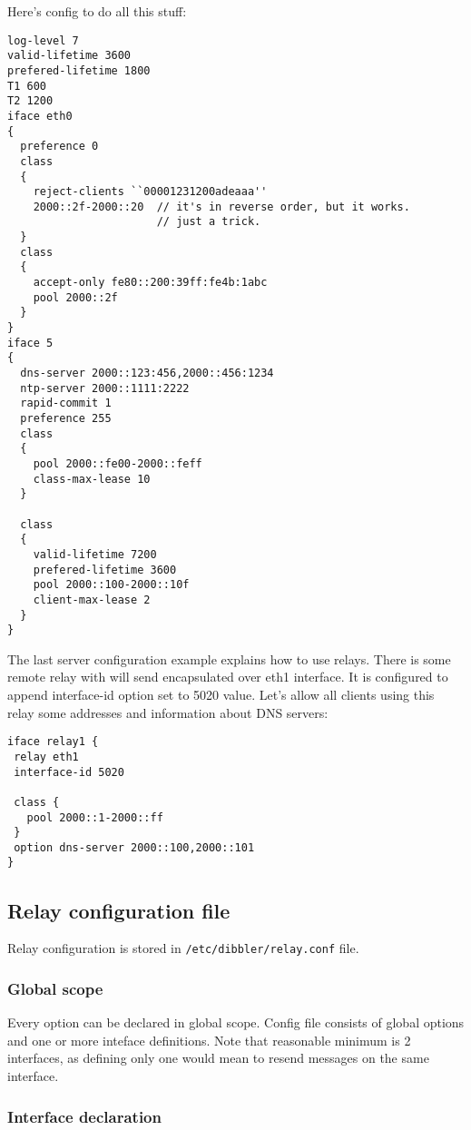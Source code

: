 Here's config to do all this stuff:

\begin{verbatim}
log-level 7
valid-lifetime 3600
prefered-lifetime 1800
T1 600
T2 1200
iface eth0
{
  preference 0
  class
  {
    reject-clients ``00001231200adeaaa''
    2000::2f-2000::20  // it's in reverse order, but it works.
                       // just a trick. 
  }
  class
  {
    accept-only fe80::200:39ff:fe4b:1abc
    pool 2000::2f 
  }
}
iface 5
{
  dns-server 2000::123:456,2000::456:1234
  ntp-server 2000::1111:2222
  rapid-commit 1
  preference 255
  class
  {
    pool 2000::fe00-2000::feff
    class-max-lease 10
  }
  
  class
  {
    valid-lifetime 7200
    prefered-lifetime 3600
    pool 2000::100-2000::10f
    client-max-lease 2
  } 
}
\end{verbatim}

The last server configuration example explains how to use
relays. There is some remote relay with will send encapsulated over
eth1 interface. It is configured to append interface-id option set to
5020 value. Let's allow all clients using this relay some addresses
and information about DNS servers:

\begin{verbatim}
iface relay1 {
 relay eth1
 interface-id 5020

 class {
   pool 2000::1-2000::ff
 }
 option dns-server 2000::100,2000::101
}
\end{verbatim}


\subsection{Relay configuration file}

Relay configuration is stored in \verb+/etc/dibbler/relay.conf+ file.

\subsubsection{Global scope}

Every option can be declared in global scope.
Config file consists of global options and one or more inteface
definitions. Note that reasonable minimum is 2 interfaces, as defining
only one would mean to resend messages on the same interface.

\subsubsection{Interface declaration}

